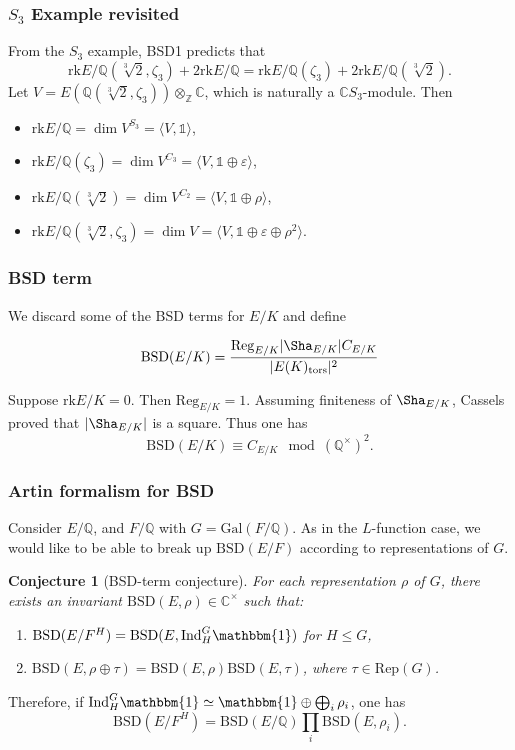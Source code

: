 \documentclass{beamer}
\newcommand{\Gal}{\mathrm{Gal}}
\newcommand{\BSD}{\mathrm{BSD}}
\newcommand{\tors}{\mathrm{tors}}
\newcommand{\Reg}{\mathrm{Reg}}
\newcommand{\rk}{\mathrm{rk}}
\newcommand{\trivial}{\mathbbm{1}}
\newcommand{\Ind}{\mathrm{Ind}}
\newcommand{\Rep}{\mathrm{Rep}}
\newcommand{\CC}{\mathbb{C}}
\newcommand{\QQ}{\mathbb{Q}}
\newcommand{\ZZ}{\mathbb{Z}}
\theoremstyle{plain}
\newtheorem{conjecture}[thm]{Conjecture}
\begin{document}
\begin{frame}
    \frametitle{$S_3$ Example revisited}
    \begin{example}
        From the $S_3$ example, BSD1 predicts that $$\rk E/\QQ(\sqrt[3]{2},\zeta_3)+2\rk E/\QQ=\rk E/\QQ(\zeta_3)+2\rk E/\QQ(\sqrt[3]{2}).$$ \pause
        Let $V=E(\QQ(\sqrt[3]{2},\zeta_3))\otimes_\ZZ \CC$, which is naturally a $\CC S_3$-module. \pause Then 
        \begin{itemize}
            \item $\rk E/\QQ=\dim V^{S_3}= \langle V,\mathds{1}\rangle$,
            \item $\rk E/\QQ(\zeta_3)=\dim V^{C_3}=\langle V,\mathds{1}\oplus\varepsilon\rangle$,
            \item $\rk E/\QQ(\sqrt[3]{2})=\dim V^{C_2}=\langle V,\mathds{1}\oplus\rho\rangle$,
            \item $\rk E/\QQ(\sqrt[3]{2},\zeta_3)=\dim V=\langle V,\mathds{1}\oplus\varepsilon\oplus\rho^2\rangle$.
        \end{itemize}
    \end{example}

\end{frame}

\begin{frame}
    \frametitle{BSD term}
    We discard some of the BSD terms for $E / K$
    and define  

    \begin{definition}
        $$\BSD(E / K) = \frac{\Reg_{E / K}|\Sha_{E / K}| C_{E / K}}{|E(K)_{\tors}|^2 }$$
    \end{definition}
    \pause

    Suppose $\rk E / K = 0$. Then $\Reg_{E / K} = 1$. Assuming finiteness of $\Sha_{E / K}$, Cassels proved that $|\Sha_{E / K}|$ is a square. \pause Thus one has
    $$ \BSD(E / K) \equiv C_{E / K} \mod (\QQ^{\times})^2. $$
\end{frame}

\begin{frame}
    \frametitle{Artin formalism for BSD}
    Consider $E / \QQ$, and $F / \QQ$ with $G = \Gal(F / \QQ)$.  \pause
    As in the $L$-function case, we would like to be able to break up $\BSD(E / F)$ according to representations of $G$. \pause
    
    \begin{conjecture}[BSD-term conjecture]
        For each representation $\rho$ of $G$, there exists an invariant $\BSD(E, \rho) \in \CC^{\times}$ such that:\pause
        \begin{enumerate}
            \item$\BSD(E / F^H) = \BSD(E, \Ind_H^G \trivial)$ for $H \leq G$, \pause
            \item $\BSD(E, \rho \oplus \tau) = \BSD(E, \rho)\BSD(E , \tau)$, where $\tau \in \Rep(G)$.\pause
        \end{enumerate}
    \end{conjecture}

    Therefore, if $\Ind_H^G \trivial \simeq \trivial \oplus \bigoplus_i \rho_i$, one has
    $$ \BSD(E / F^H) = \BSD(E / \QQ)\prod_i \BSD(E, \rho_i). $$ 
\end{frame}
\end{document}
